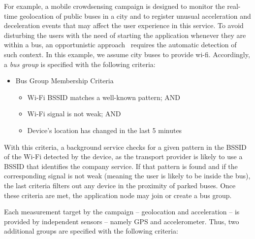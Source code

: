 For example, a mobile crowdsensing campaign is designed to monitor the real-time geolocation of public buses in a city and to register unusual acceleration and deceleration events that may affect the user experience in this service. To avoid disturbing the users with the need of starting the application whenever they are within a bus, an opportunistic approach~\cite{} requires the automatic detection of such context. In this example, we assume city buses to provide wi-fi. Accordingly, a \textit{bus group} is specified with the following criteria:

\begin{itemize}
	
	\item Bus Group Membership Criteria
	
	\begin{itemize}
		
		\item Wi-Fi BSSID matches a well-known pattern; AND
		
		\item Wi-Fi signal is not weak; AND
		
		\item Device's location has changed in the last 5 minutes
		
	\end{itemize}
	
\end{itemize}

With this criteria, a background service checks for a given pattern in the BSSID of the Wi-Fi detected by the device, as the transport provider is likely to use a BSSID that identifies the company service. If that pattern is found and if the corresponding signal is not weak (meaning the user is likely to be inside the bus), the last criteria filters out any device in the proximity of parked buses. Once these criteria are met, the application node may join or create a bus group.

Each measurement target by the campaign -- geolocation and acceleration -- is provided by independent sensors -- namely GPS and accelerometer. Thus, two additional groups are specified with the following criteria:

